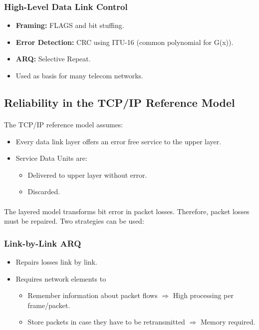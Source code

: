 \documentclass[../resumosRCOM.tex]{subfiles}
\begin{document}
\subsubsection{High-Level Data Link Control}
\begin{itemize}
    \item \textbf{Framing:} FLAGS and bit stuffing.
    \item \textbf{Error Detection:} CRC using ITU-16 (common polynomial for G(x)).
    \item \textbf{ARQ:} Selective Repeat.
    \item Used as basis for many telecom networks.
\end{itemize}



\subsection{Reliability in the TCP/IP Reference Model}
\paragraph{}
The TCP/IP reference model assumes:
\begin{itemize}
    \item Every data link layer offers an error free service to the upper layer.
    \item Service Data Units are:
    \begin{itemize}
        \item Delivered to upper layer without error.
        \item Discarded.
    \end{itemize} 
\end{itemize}
\paragraph{}
The layered model transforms bit error in packet losses.
Therefore, packet losses must be repaired.
Two strategies can be used:
\subsubsection{Link-by-Link ARQ}
\begin{itemize}
    \item Repairs losses link by link.
    \item Requires network elements to 
    \begin{itemize}
        \item Remember information about packet flows $\Rightarrow$ High processing 
        per frame/packet.
        \item Store packets in case they have to be retransmitted $\Rightarrow$
        Memory required.
    \end{itemize}
\end{itemize}
\end{document}
